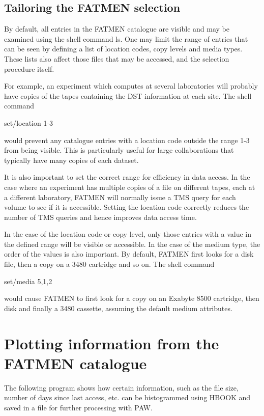 \subsection{Tailoring the FATMEN selection}
\par
By default, all entries in the FATMEN catalogue are visible and may
be examined using the shell command ls. One may limit the range
of entries that can be seen by defining a list of location codes,
copy levels and media types. These lists also affect those files
that may be accessed, and the selection procedure itself.
\par
For example, an experiment which computes at several laboratories will
probably have copies of the tapes containing the DST information at
each site. The shell command
\begin{XMP}
set/location 1-3
\end{XMP}
would prevent any catalogue entries with a location code outside the range
1-3 from being visible. This is particularly useful for large collaborations
that typically have many copies of each dataset.
\par
It is also important to set the correct range for efficiency in data access.
In the case where an experiment has multiple copies of a file on different tapes,
each at a different laboratory, FATMEN will normally issue a TMS query
for each volume to see if it is accessible. Setting the location code
correctly reduces the number of TMS queries and hence improves data access time.
\par
In the case of the location code or copy level, only those entries with
a value in the defined range will be visible or accessible.
In the case of the medium type, the order of the values is also important.
By default, FATMEN first looks for a disk file, then a copy on a 3480 cartridge and so
on. The shell command
\begin{XMP}
set/media 5,1,2
\end{XMP}
would cause FATMEN to first look for a copy on an Exabyte 8500 cartridge,
then disk and finally a 3480 cassette, assuming the default medium attributes.

\section{Plotting information from the FATMEN catalogue}

The following program shows how certain information, such as the
file size, number of days since last access, etc. can be histogrammed
using HBOOK and saved in a file for further processing with PAW.

